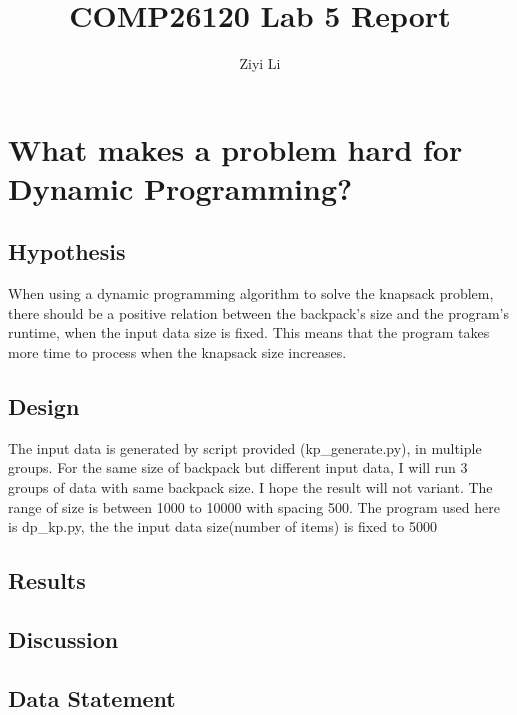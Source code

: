 \documentclass[a4]{article}
\title{COMP26120 Lab 5 Report}
\author{Ziyi Li}
\begin{document}
\maketitle


\section{What makes a problem hard for Dynamic Programming?}

\subsection{Hypothesis}

When using a dynamic programming algorithm to solve the knapsack problem, there should be a positive relation between the backpack's size and the program's runtime, when the input data size is fixed. This means that the program takes more time to process when the knapsack size increases.

\subsection{Design}

The input data is generated by script provided (kp\_generate.py), in multiple groups. For the same size of backpack but different input data, I will run 3 groups of data with same backpack size. I hope the result will not variant. The range of size is between 1000 to 10000 with spacing 500. The program used here is dp\_kp.py, the the input data size(number of items) is fixed to 5000

\subsection{Results}
\subsection{Discussion}
\subsection{Data Statement}


\appendix

\end{document}
